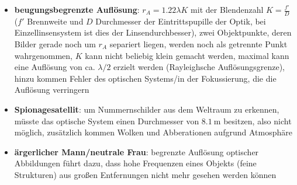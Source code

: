 \linie
\begin{itemize}
    \item
    \textbf{beugungsbegrenzte Auflösung}:
    $r_A = 1.22 \lambda K$ mit der Blendenzahl $K = \frac{f'}{D}$
    ($f'$ Brennweite und $D$ Durchmesser der Eintrittspupille der Optik,
    bei Einzellinsensystem ist dies der Linsendurchbesser), zwei Objektpunkte,
    deren Bilder gerade noch um $r_A$ separiert liegen, werden noch als
    getrennte Punkt wahrgenommen,
    $K$ kann nicht beliebig klein gemacht werden, maximal kann eine Auflösung
    von ca. $\lambda/2$ erzielt werden
    (Rayleighsche Auflösungsgrenze),
    hinzu kommen Fehler des optischen Systems/in der Fokussierung, die
    die Auflösung verringern
    
    \item
    \textbf{Spionagesatellit}:
    um Nummernschilder aus dem Weltraum zu erkennen, müsste das optische System
    einen Durchmesser von $\SI{8.1}{\meter}$ besitzen, also nicht möglich,
    zusätzlich kommen Wolken und Abberationen aufgrund Atmosphäre
    
    \item
    \textbf{ärgerlicher Mann/neutrale Frau}:
    begrenzte Auflösung optischer Abbildungen führt dazu, dass hohe Frequenzen
    eines Objekts (feine Strukturen) aus großen Entfernungen nicht mehr gesehen
    werden können
\end{itemize}
\linie
\pagebreak
